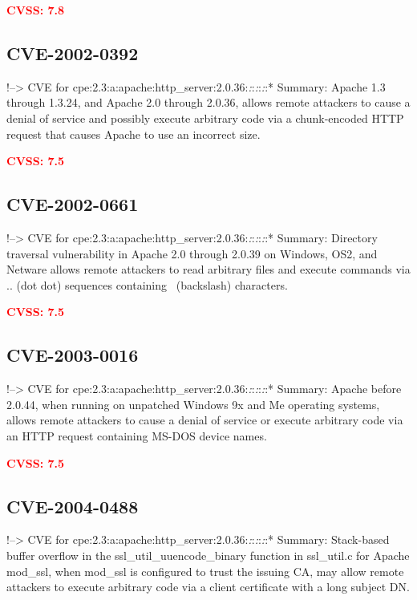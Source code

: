 \documentclass[a4paper, 12pt]{article}
\begin{document}
\textbf{\textcolor{red}{CVSS: 7.8}}

\hypertarget{cve-2002-0392}{%
\subsection{CVE-2002-0392}\label{cve-2002-0392}}

!--\textgreater{} CVE for
cpe:2.3:a:apache:http\_server:2.0.36:\emph{:}:\emph{:}:\emph{:}:*
Summary: Apache 1.3 through 1.3.24, and Apache 2.0 through 2.0.36,
allows remote attackers to cause a denial of service and possibly
execute arbitrary code via a chunk-encoded HTTP request that causes
Apache to use an incorrect size.

\textbf{\textcolor{red}{CVSS: 7.5}}

\hypertarget{cve-2002-0661}{%
\subsection{CVE-2002-0661}\label{cve-2002-0661}}

!--\textgreater{} CVE for
cpe:2.3:a:apache:http\_server:2.0.36:\emph{:}:\emph{:}:\emph{:}:*
Summary: Directory traversal vulnerability in Apache 2.0 through 2.0.39
on Windows, OS2, and Netware allows remote attackers to read arbitrary
files and execute commands via .. (dot dot) sequences containing
~(backslash) characters.

\textbf{\textcolor{red}{CVSS: 7.5}}

\hypertarget{cve-2003-0016}{%
\subsection{CVE-2003-0016}\label{cve-2003-0016}}

!--\textgreater{} CVE for
cpe:2.3:a:apache:http\_server:2.0.36:\emph{:}:\emph{:}:\emph{:}:*
Summary: Apache before 2.0.44, when running on unpatched Windows 9x and
Me operating systems, allows remote attackers to cause a denial of
service or execute arbitrary code via an HTTP request containing MS-DOS
device names.

\textbf{\textcolor{red}{CVSS: 7.5}}

\hypertarget{cve-2004-0488}{%
\subsection{CVE-2004-0488}\label{cve-2004-0488}}

!--\textgreater{} CVE for
cpe:2.3:a:apache:http\_server:2.0.36:\emph{:}:\emph{:}:\emph{:}:*
Summary: Stack-based buffer overflow in the ssl\_util\_uuencode\_binary
function in ssl\_util.c for Apache mod\_ssl, when mod\_ssl is configured
to trust the issuing CA, may allow remote attackers to execute arbitrary
code via a client certificate with a long subject DN.
\end{document}
